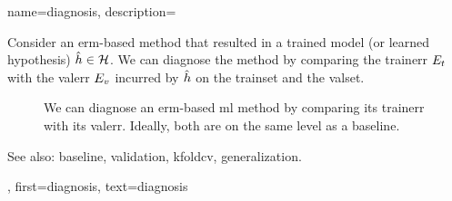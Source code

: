 {name={diagnosis},
	description={Consider an \gls{erm}-based method that resulted in a trained \gls{model} 
		(or learned \gls{hypothesis}) $\hat{h} \in \mathcal{H}$. We can diagnose the 
		method by comparing the \gls{trainerr} $E_{t}$ with the \gls{valerr} $E_{v}$ 
		incurred by $\hat{h}$ on the \gls{trainset} and the \gls{valset}. 
		\begin{figure}[H]
			\begin{center}
			\end{center}
		\caption{We can diagnose an \gls{erm}-based \gls{ml} method by comparing its \gls{trainerr} 
			with its \gls{valerr}. Ideally, both are on the same level as a \gls{baseline}.\label{fig_diagnosis_dict}}
		\end{figure}
		See also: \gls{baseline}, \gls{validation}, \gls{kfoldcv}, \gls{generalization}.},
	first={diagnosis},
	text={diagnosis}
} 

